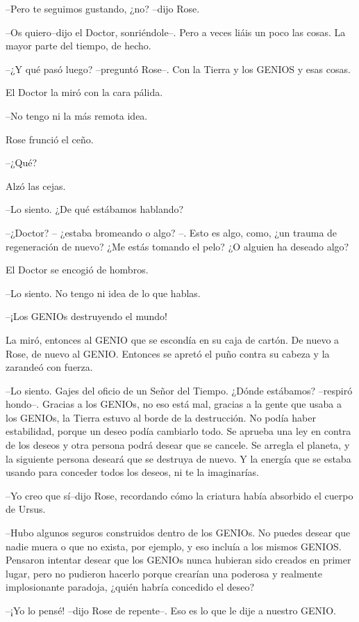 --Pero te seguimos gustando, ¿no? --dijo Rose.

--Os quiero--dijo el Doctor, sonriéndole--. Pero a veces liáis un poco
las cosas. La mayor parte del tiempo, de hecho.

--¿Y qué pasó luego? --preguntó Rose--. Con la Tierra y los GENIOS y
esas cosas.

El Doctor la miró con la cara pálida.

--No tengo ni la más remota idea.

Rose frunció el ceño.

--¿Qué?

Alzó las cejas.

--Lo siento. ¿De qué estábamos hablando?

--¿Doctor? -- ¿estaba bromeando o algo? --. Esto es algo, como, ¿un
trauma de regeneración de nuevo? ¿Me estás tomando el pelo? ¿O alguien
ha deseado algo?

El Doctor se encogió de hombros.

--Lo siento. No tengo ni idea de lo que hablas.

--¡Los GENIOs destruyendo el mundo!

La miró, entonces al GENIO que se escondía en su caja de cartón. De
nuevo a Rose, de nuevo al GENIO. Entonces se apretó el puño contra su
cabeza y la zarandeó con fuerza.

--Lo siento. Gajes del oficio de un Señor del Tiempo. ¿Dónde estábamos?
--respiró hondo--. Gracias a los GENIOs, no eso está mal, gracias a la
gente que usaba a los GENIOs, la Tierra estuvo al borde de la
destrucción. No podía haber estabilidad, porque un deseo podía cambiarlo
todo. Se aprueba una ley en contra de los deseos y otra persona podrá
desear que se cancele. Se arregla el planeta, y la siguiente persona
deseará que se destruya de nuevo. Y la energía que se estaba usando para
conceder todos los deseos, ni te la imaginarías.

--Yo creo que sí--dijo Rose, recordando cómo la criatura había absorbido
el cuerpo de Ursus.

--Hubo algunos seguros construidos dentro de los GENIOs. No puedes
desear que nadie muera o que no exista, por ejemplo, y eso incluía a los
mismos GENIOS. Pensaron intentar desear que los GENIOs nunca hubieran
sido creados en primer lugar, pero no pudieron hacerlo porque crearían
una poderosa y realmente implosionante paradoja, ¿quién habría concedido
el deseo?

--¡Yo lo pensé! --dijo Rose de repente--. Eso es lo que le dije a
nuestro GENIO.


